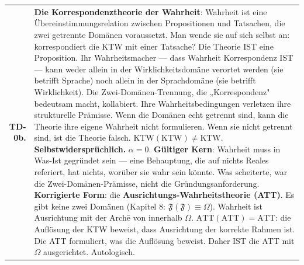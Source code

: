 \documentclass[10pt, openany, oneside]{book}
\begin{document}
{\begin{tabular}{r p{}}
\textbf{TD-0b.} & \textbf{Die Korrespondenztheorie der Wahrheit}: Wahrheit ist eine Übereinstimmungsrelation zwischen Propositionen und Tatsachen, die zwei getrennte Domänen voraussetzt. Man wende sie auf sich selbst an: korrespondiert die KTW mit einer Tatsache? Die Theorie IST eine Proposition. Ihr Wahrheitsmacher --- dass Wahrheit Korrespondenz IST --- kann weder allein in der Wirklichkeitsdomäne verortet werden (sie betrifft Sprache) noch allein in der Sprachdomäne (sie betrifft Wirklichkeit). Die Zwei-Domänen-Trennung, die „Korrespondenz" bedeutsam macht, kollabiert. Ihre Wahrheitsbedingungen verletzen ihre strukturelle Prämisse. Wenn die Domänen echt getrennt sind, kann die Theorie ihre eigene Wahrheit nicht formulieren. Wenn sie nicht getrennt sind, ist die Theorie falsch. $\text{KTW}(\text{KTW}) \neq \text{KTW}$. \textbf{Selbstwidersprüchlich.} $\alpha = 0$. \textbf{Gültiger Kern}: Wahrheit muss in Was-Ist gegründet sein --- eine Behauptung, die auf nichts Reales referiert, hat nichts, worüber sie wahr sein könnte. Was scheiterte, war die Zwei-Domänen-Prämisse, nicht die Gründungsanforderung. \textbf{Korrigierte Form}: die \textbf{Ausrichtungs-Wahrheitstheorie (ATT)}. Es gibt keine zwei Domänen (Kapitel 8: $\mathfrak{F}(\mathfrak{F}) \equiv \Omega$). Wahrheit ist Ausrichtung mit der Arch\={e} von innerhalb $\Omega$. $\text{ATT}(\text{ATT}) = \text{ATT}$: die Auflösung der KTW beweist, dass Ausrichtung der korrekte Rahmen ist. Die ATT formuliert, was die Auflösung beweist. Daher IST die ATT mit $\Omega$ ausgerichtet. Autologisch. \\[0.3em]
\end{tabular}
}

\vspace{0.5em}
\end{document}
